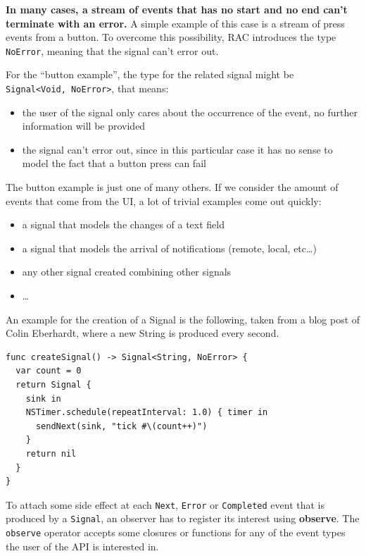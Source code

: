 \textbf{In many cases, a stream of events that has no start and no end
can't terminate with an error.} A simple example of this case is a
stream of press events from a button. To overcome this possibility, RAC
introduces the type \texttt{NoError}, meaning that the signal can't
error out.

For the ``button example'', the type for the related signal might be
\texttt{Signal\textless{}Void,\ NoError\textgreater{}}, that means:

\begin{itemize}
\itemsep1pt\parskip0pt
\item
  the user of the signal only cares about the occurrence of the event, no
  further information will be provided
\item
  the signal can't error out, since in this particular case it has no
  sense to model the fact that a button press can fail
\end{itemize}

The button example is just one of many others. If we consider the amount
of events that come from the UI, a lot of trivial examples come out
quickly:

\begin{itemize}
\itemsep1pt\parskip0pt
\item
  a signal that models the changes of a text field
\item
  a signal that models the arrival of notifications (remote, local,
  etc\ldots{})
\item
  any other signal created combining other signals
\item
  \ldots{}
\end{itemize}

An example for the creation of a Signal is the following, taken from a
blog post of Colin Eberhardt, where a new String is produced every
second.

\begin{verbatim}
func createSignal() -> Signal<String, NoError> {
  var count = 0
  return Signal {
    sink in
    NSTimer.schedule(repeatInterval: 1.0) { timer in
      sendNext(sink, "tick #\(count++)")
    }
    return nil
  }
}
\end{verbatim}

To attach some side effect at each \texttt{Next}, \texttt{Error} or
\texttt{Completed} event that is produced by a \texttt{Signal}, an
observer has to register its interest using \textbf{observe}. The
\texttt{observe} operator accepts some closures or functions for any of
the event types the user of the API is interested in.

